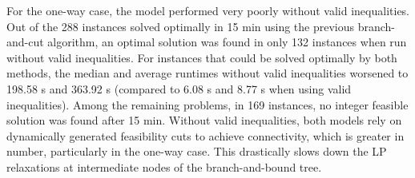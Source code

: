 \documentclass[10pt]{article}
\theoremstyle{definition}
\begin{document}
For the one-way case, the model performed very poorly without valid inequalities. Out of the 288 instances solved optimally in 15 min using the previous branch-and-cut algorithm, an optimal solution was found in only 132 instances when run without valid inequalities. For instances that could be solved optimally by both methods, the median and average runtimes without valid inequalities worsened to 198.58 s and 363.92 s (compared to 6.08 s and 8.77 s when using valid inequalities). Among the remaining problems, in 169 instances, no integer feasible solution was found after 15 min. Without valid inequalities, both models rely on dynamically generated feasibility cuts to achieve connectivity, which is greater in number, particularly in the one-way case. This drastically slows down the LP relaxations at intermediate nodes of the branch-and-bound tree. 
\end{document}
